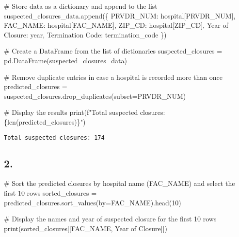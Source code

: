 \documentclass[
  letterpaper,
  DIV=11,
  numbers=noendperiod]{scrartcl}
\newenvironment{Shaded}{\begin{snugshade}}{\end{snugshade}}
\newcommand{\BuiltInTok}[1]{\textcolor[rgb]{0.00,0.23,0.31}{#1}}
\newcommand{\CommentTok}[1]{\textcolor[rgb]{0.37,0.37,0.37}{#1}}
\newcommand{\DecValTok}[1]{\textcolor[rgb]{0.68,0.00,0.00}{#1}}
\newcommand{\NormalTok}[1]{\textcolor[rgb]{0.00,0.23,0.31}{#1}}
\newcommand{\OperatorTok}[1]{\textcolor[rgb]{0.37,0.37,0.37}{#1}}
\newcommand{\SpecialCharTok}[1]{\textcolor[rgb]{0.37,0.37,0.37}{#1}}
\newcommand{\SpecialStringTok}[1]{\textcolor[rgb]{0.13,0.47,0.30}{#1}}
\newcommand{\StringTok}[1]{\textcolor[rgb]{0.13,0.47,0.30}{#1}}
\begin{document}
\begin{Shaded}
\begin{Highlighting}[]
            \CommentTok{\# Store data as a dictionary and append to the list}
\NormalTok{            suspected\_closures\_data.append(\{}
                \StringTok{\textquotesingle{}PRVDR\_NUM\textquotesingle{}}\NormalTok{: hospital[}\StringTok{\textquotesingle{}PRVDR\_NUM\textquotesingle{}}\NormalTok{],}
                \StringTok{\textquotesingle{}FAC\_NAME\textquotesingle{}}\NormalTok{: hospital[}\StringTok{\textquotesingle{}FAC\_NAME\textquotesingle{}}\NormalTok{],}
                \StringTok{\textquotesingle{}ZIP\_CD\textquotesingle{}}\NormalTok{: hospital[}\StringTok{\textquotesingle{}ZIP\_CD\textquotesingle{}}\NormalTok{],}
                \StringTok{\textquotesingle{}Year of Closure\textquotesingle{}}\NormalTok{: year,}
                \StringTok{\textquotesingle{}Termination Code\textquotesingle{}}\NormalTok{: termination\_code}
\NormalTok{            \})}

\CommentTok{\# Create a DataFrame from the list of dictionaries}
\NormalTok{suspected\_closures }\OperatorTok{=}\NormalTok{ pd.DataFrame(suspected\_closures\_data)}

\CommentTok{\# Remove duplicate entries in case a hospital is recorded more than once}
\NormalTok{predicted\_closures }\OperatorTok{=}\NormalTok{ suspected\_closures.drop\_duplicates(subset}\OperatorTok{=}\StringTok{\textquotesingle{}PRVDR\_NUM\textquotesingle{}}\NormalTok{)}

\CommentTok{\# Display the results}
\BuiltInTok{print}\NormalTok{(}\SpecialStringTok{f"Total suspected closures: }\SpecialCharTok{\{}\BuiltInTok{len}\NormalTok{(predicted\_closures)}\SpecialCharTok{\}}\SpecialStringTok{"}\NormalTok{)}
\end{Highlighting}
\end{Shaded}

\begin{verbatim}
Total suspected closures: 174
\end{verbatim}

\subsection{2.}\label{section-1}

\begin{Shaded}
\begin{Highlighting}[]
\CommentTok{\# Sort the predicted closures by hospital name (FAC\_NAME) and select the first 10 rows}
\NormalTok{sorted\_closures }\OperatorTok{=}\NormalTok{ predicted\_closures.sort\_values(by}\OperatorTok{=}\StringTok{\textquotesingle{}FAC\_NAME\textquotesingle{}}\NormalTok{).head(}\DecValTok{10}\NormalTok{)}

\CommentTok{\# Display the names and year of suspected closure for the first 10 rows}
\BuiltInTok{print}\NormalTok{(sorted\_closures[[}\StringTok{\textquotesingle{}FAC\_NAME\textquotesingle{}}\NormalTok{, }\StringTok{\textquotesingle{}Year of Closure\textquotesingle{}}\NormalTok{]])}
\end{Highlighting}
\end{Shaded}
\end{document}
